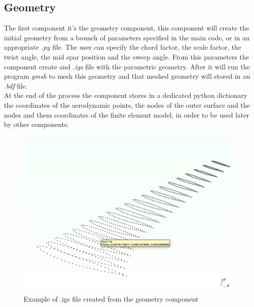 \subsection{Geometry  }
The first component it's the geometry component, this component will create the initial geometry from a bounch of parameters specified in the main code, or in an appropriate \textit{.py} file. The user can specify the chord factor, the scale factor, the twist angle, the mid spar position and the sweep angle. From this parameters the component create and \textit{.igs} file with the parametric geometry. After it will run the program \textit{gmsh} to mesh this geometry and that meshed geometry will stored in an \textit{.bdf} file. \\
At the end of the process the component stores in a dedicated python dictionary the coordinates of the aerodynamic points, the nodes of the outer surface and the nodes and them coordinates of the finite element model, in order to be used later by other components.
\begin{figure}[H]
	\centering
	\includegraphics[width = 1\textwidth]{./Immagini/2_2.png}
	\caption{Example of .igs file created from the geometry component}
	\label{fig:2_2}
\end{figure}
